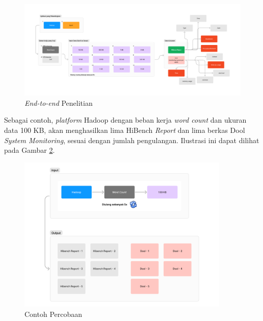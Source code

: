 
\begin{landscape}
\begin{figure}[h]
    \centering
    \includegraphics[width=\linewidth, height=0.5\linewidth]{figures/ch03/flow-penelitian-umum.png}
    \caption{\textit{End-to-end} Penelitian}
    \label{fig:flow-penelitian-umum}
\end{figure}
\end{landscape}

Sebagai contoh, \textit{platform} Hadoop dengan beban kerja \textit{word count} dan ukuran data 100 KB, akan menghasilkan lima HiBench \textit{Report} dan lima berkas Dool \textit{System Monitoring}, sesuai dengan jumlah pengulangan.  Ilustrasi ini dapat dilihat pada Gambar \ref{fig:contoh-percobaan}.

\begin{figure}[h]
    \centering
    \includegraphics[width=0.9\textwidth]{figures/ch03/contoh-percobaan.png}
    \caption{Contoh Percobaan}
    \label{fig:contoh-percobaan}
\end{figure}

